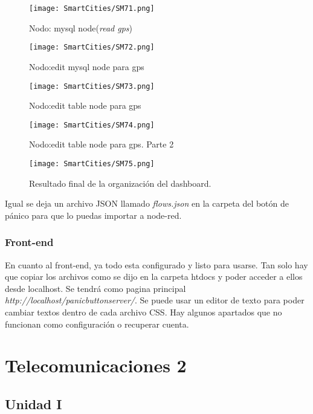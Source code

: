 \documentclass[
	12pt, %
	fleqn, %
	a4paper, %
]{LegrandOrangeBook}
\begin{document}
\begin{figure}[H]
\centering\texttt{[image: SmartCities/SM71.png]}
\caption{Nodo: mysql node(\textit{read gps})}
\label{fig:nodomysql4}
\end{figure}
\begin{figure}[H]
\centering\texttt{[image: SmartCities/SM72.png]}
\caption{Nodo:edit mysql node para gps}
\label{fig:nodomysql5}
\end{figure}
\begin{figure}[H]
\centering\texttt{[image: SmartCities/SM73.png]}
\caption{Nodo:edit table node para gps}
\label{fig:nodotable1}
\end{figure}
\begin{figure}[H]
\centering\texttt{[image: SmartCities/SM74.png]}
\caption{Nodo:edit table node para gps. Parte 2}
\label{fig:nodotable2}
\end{figure}
\begin{figure}[H]
\centering\texttt{[image: SmartCities/SM75.png]}
\caption{Resultado final de la organización del dashboard.}
\label{fig:dash}
\end{figure}
Igual se deja un archivo JSON llamado \textit{flows.json} en la carpeta del botón de pánico para que lo puedas importar a node-red.
\newpage
\section{Front-end}
En cuanto al front-end, ya todo esta configurado y listo para usarse. Tan solo hay que copiar los archivos como se dijo en la carpeta htdocs y poder acceder a ellos desde localhost. Se tendrá como pagina principal \textit{http://localhost/panicbuttonserver/}. Se puede usar un editor de texto para poder cambiar textos dentro de cada archivo CSS. Hay algunos apartados que no funcionan como configuración o recuperar cuenta.
\part{Telecomunicaciones 2}

\chapter{Unidad I}
\end{document}
